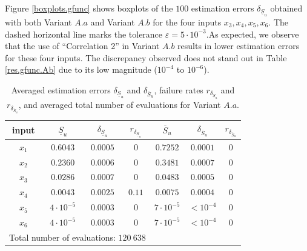 Figure \ref{boxplots.gfunc} shows boxplots of the $100$ estimation errors $\delta_{\underline{S}_u}$ obtained with both Variant $A.a$ and Variant $A.b$ for the four inputs $x_3,x_4,x_5,x_6$. The dashed horizontal line marks the tolerance $\varepsilon=5\cdot 10^{-3}$.As expected, we observe that the use of ``Correlation 2'' in Variant $A.b$ results in lower estimation errors for these four inputs. The discrepancy observed does not stand out in Table \ref{res.gfunc.Ab} due to its low magnitude ($10^{-4}$ to $10^{-6}$).

\setlength{\tabcolsep}{5.5pt}
\renewcommand{\arraystretch}{1.25}
\begin{table}[t]
\caption{Averaged estimation errors $\delta_{\underline{S}_u}$ and $\delta_{\overline{S}_u}$, failure rates $r_{\delta_{\underline{S}_u}}$ and $r_{\delta_{\overline{S}_u}}$, and averaged total number of evaluations for Variant $A.a$.}
\centering
\begin{tabular}{ccccccc}
\hline
 input & $\underline{S}_u$ & $\delta_{\underline{S}_u}$ & $r_{\delta_{\underline{S}_u}}$ & $\overline{S}_u$ & $\delta_{\overline{S}_u}$ &$r_{\delta_{\overline{S}_u}}$ \\ \hline
 $x_1$ & $0.6043$ &  $0.0005$ & $0$ & $0.7252$ & $0.0001$ & $0$ \\ \hline
 $x_2$ & $0.2360$ &  $0.0006$ & $0$ & $0.3481$ & $0.0007$ & $0$ \\ \hline
 $x_3$ & $0.0286$ &  $0.0007$ & $0$ & $0.0483$ & $0.0005$ & $0$ \\ \hline
 $x_4$ & $0.0043$ &  $0.0025$ & $0.11$ & $0.0075$ & $0.0004$ & $0$ \\ \hline
 $x_5$ & $4\cdot 10^{-5}$ & $0.0003$ & $0$ & $7\cdot 10^{-5}$ & $< 10^{-4}$ & $0$ \\ \hline
 $x_6$ & $4\cdot 10^{-5}$ & $0.0003$ & $0$  & $7\cdot 10^{-5}$ & $< 10^{-4}$ & $0$ \\ \hline \hline
\multicolumn{4}{l}{Total number of evaluations: $120 \ 638$} & & &\\ \hline 
\end{tabular}
\label{res.gfunc.Aa}
\end{table}
